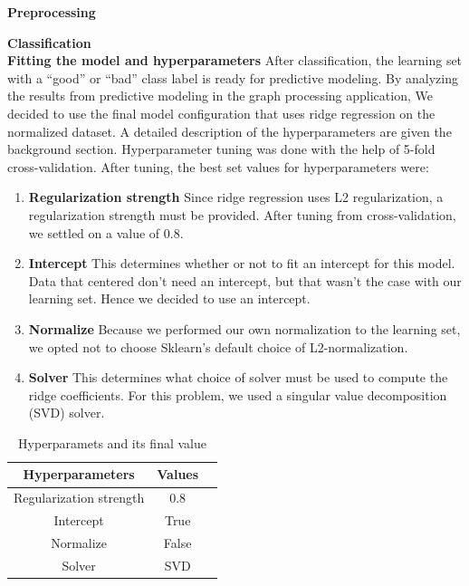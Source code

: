 \textbf{Preprocessing}\\

\textbf{Classification}\\

\textbf{Fitting the model and hyperparameters}
After classification, the learning set with a ``good'' or ``bad'' class label is ready for predictive modeling. By analyzing the results from predictive modeling in the graph processing application, We decided to use the final model configuration that uses ridge regression on the normalized dataset. A detailed description of the hyperparameters are given the background section. Hyperparameter tuning was done with the help of 5-fold cross-validation. After tuning, the best set values for hyperparameters were:

\begin{enumerate}


    \item \textbf{Regularization strength}
Since ridge regression uses L2 regularization, a regularization strength must be provided. After tuning from cross-validation, we settled on a value of 0.8.

    \item \textbf{Intercept}
This determines whether or not to fit an intercept for this model. Data that centered don't need an intercept, but that wasn't the case with our learning set. Hence we decided to use an intercept.

    \item \textbf{Normalize}
Because we performed our own normalization to the learning set, we opted not to choose Sklearn's default choice of L2-normalization.
    
    \item \textbf{Solver}
This determines what choice of solver must be used to compute the ridge coefficients. For this problem, we used a singular value decomposition (SVD) solver.
    
\end{enumerate}



\begin{table}
\centering
\caption{Hyperparamets and its final value}
\label{Hyperparamets and its final value}
\begin{tabular}{|c|c|c|}    \hline  

Hyperparameters                                 & Values\\ \hline\hline
Regularization strength                         & 0.8 \\ \hline
Intercept                         & True  \\ \hline
Normalize                    & False  \\ \hline
Solver                      & SVD \\ \hline

\end{tabular}
\end{table}

